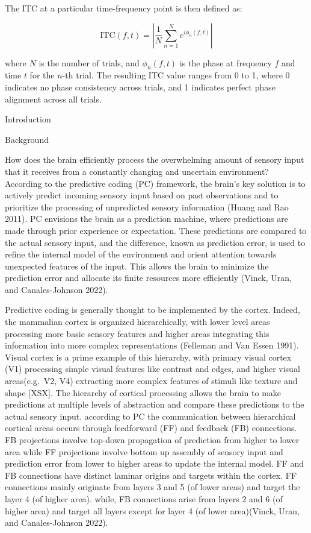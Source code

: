\documentclass[
  letterpaper,
  DIV=11,
  numbers=noendperiod]{scrartcl}
\begin{document}
The ITC at a particular time-frequency point is then defined as:

\[
\text{ITC}(f, t) = \left| \frac{1}{N} \sum_{n=1}^{N} e^{i\phi_n(f, t)} \right|
\]

where \(N\) is the number of trials, and \(\phi_n(f, t)\) is the phase
at frequency \(f\) and time \(t\) for the \(n\)-th trial. The resulting
ITC value ranges from 0 to 1, where 0 indicates no phase consistency
across trials, and 1 indicates perfect phase alignment across all
trials.

Introduction

Background

How does the brain efficiently process the overwhelming amount of
sensory input that it receives from a constantly changing and uncertain
environment? According to the predictive coding (PC) framework, the
brain's key solution is to actively predict incoming sensory input based
on past observations and to prioritize the processing of unpredicted
sensory information (Huang and Rao 2011). PC envisions the brain as a
prediction machine, where predictions are made through prior experience
or expectation. These predictions are compared to the actual sensory
input, and the difference, known as prediction error, is used to refine
the internal model of the environment and orient attention towards
unexpected features of the input. This allows the brain to minimize the
prediction error and allocate its finite resources more efficiently
(Vinck, Uran, and Canales-Johnson 2022).

Predictive coding is generally thought to be implemented by the cortex.
Indeed, the mammalian cortex is organized hierarchically, with lower
level areas processing more basic sensory features and higher areas
integrating this information into more complex representations (Felleman
and Van Essen 1991). Visual cortex is a prime example of this hierarchy,
with primary visual cortex (V1) processing simple visual features like
contrast and edges, and higher visual areas(e.g.~V2, V4) extracting more
complex features of stimuli like texture and shape {[}XSX{]}. The
hierarchy of cortical processing allows the brain to make predictions at
multiple levels of abstraction and compare these predictions to the
actual sensory input. according to PC the communication between
hierarchical cortical areas occurs through feedforward (FF) and feedback
(FB) connections. FB projections involve top-down propagation of
prediction from higher to lower area while FF projections involve bottom
up assembly of sensory input and prediction error from lower to higher
areas to update the internal model. FF and FB connections have distinct
laminar origins and targets within the cortex. FF connections mainly
originate from layers 3 and 5 (of lower areas) and target the layer 4
(of higher area). while, FB connections arise from layers 2 and 6 (of
higher area) and target all layers except for layer 4 (of lower
area)(Vinck, Uran, and Canales-Johnson 2022).
\end{document}
